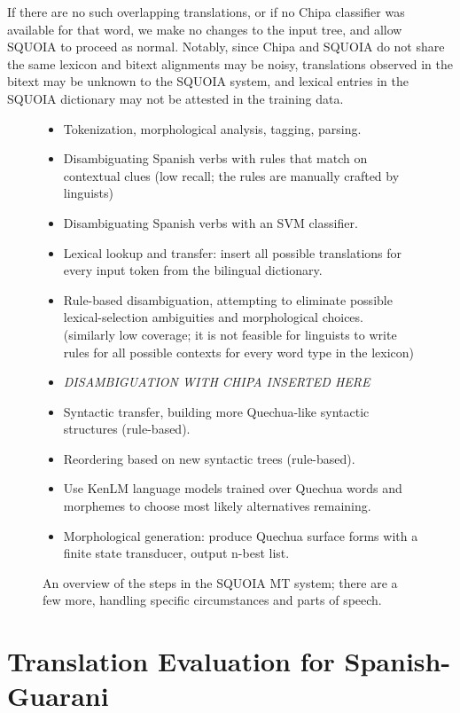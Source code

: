 If there are no such overlapping translations, or if no Chipa classifier was
available for that word, we make no changes to the input tree, and allow SQUOIA
to proceed as normal. Notably, since Chipa and SQUOIA do not share the same
lexicon and bitext alignments may be noisy, translations observed in the bitext
may be unknown to the SQUOIA system, and lexical entries in the SQUOIA
dictionary may not be attested in the training data.

\begin{figure}
  \begin{itemize}
  \item Tokenization, morphological analysis, tagging, parsing.
  \item Disambiguating Spanish verbs with rules that match on contextual clues
  (low recall; the rules are manually crafted by linguists)
  \item Disambiguating Spanish verbs with an SVM classifier.
  \item Lexical lookup and transfer: insert all possible translations for every
  input token from the bilingual dictionary.
  \item Rule-based disambiguation, attempting to eliminate possible
  lexical-selection ambiguities and morphological choices. (similarly low
  coverage; it is not feasible for linguists to write rules for all possible
  contexts for every word type in the lexicon)
  \item \emph{DISAMBIGUATION WITH CHIPA INSERTED HERE}
  \item Syntactic transfer, building more Quechua-like syntactic structures
  (rule-based).
  \item Reordering based on new syntactic trees (rule-based).
  \item Use KenLM language models trained over Quechua words and morphemes to
  choose most likely alternatives remaining.
  \item Morphological generation: produce Quechua surface forms with a finite
  state transducer, output n-best list.
  \end{itemize}

  \caption{An overview of the steps in the SQUOIA MT system; there are a few
  more, handling specific circumstances and parts of speech.}
  \label{fig:squoia-steps}
\end{figure}


\section{Translation Evaluation for Spanish-Guarani}

